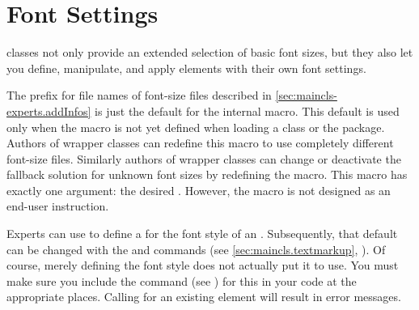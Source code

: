 \section{Font Settings}

\KOMAScript{} classes not only provide an extended selection of basic font
sizes, but they also let you define, manipulate, and apply elements with
their own font settings.

\begin{Declaration}
\end{Declaration}
The  prefix for file names of font-size files described
in \autoref{sec:maincls-experts.addInfos} is just the default for the
internal  macro. This
default is used only when the macro is not yet defined when loading a
\KOMAScript{} class or the  package. Authors of wrapper
classes can redefine this macro to use completely different font-size files.
Similarly authors of wrapper classes can change or deactivate
the fallback solution for unknown font sizes by redefining the
 macro. This macro
has exactly one argument: the desired .
However, the  macro is not
designed as an end-user instruction.%
\EndIndexGroup


\begin{Declaration}
\end{Declaration}
Experts can use  to define a  for the font
style of an . Subsequently, that default can be changed with
the  and 
commands (see \autoref{sec:maincls.textmarkup},
). Of course, merely defining the font
style does not actually put it to use. You must make sure you include the
%
 command
(see ) for this  in your
code at the appropriate places. Calling  for an existing
element will result in error messages.

